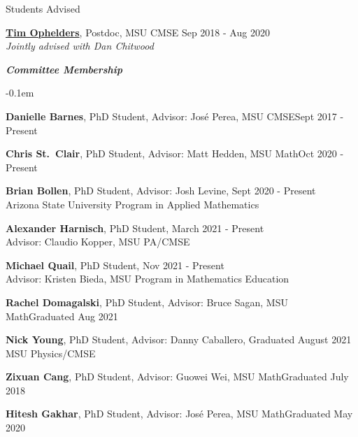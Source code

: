 \documentclass{resume} %
\begin{document}
\begin{rSection}{Students Advised}
\begin{list}{}{\leftmargin=1em}
   \item \textbf{\href{https://research.tue.nl/en/persons/tim-ae-ophelders}{Tim Ophelders}}, Postdoc, MSU CMSE \hfill Sep 2018 - Aug 2020\\
   \phantom{XXX} \textit{Jointly advised with Dan Chitwood}
\end{list}

\textbf{\textit{Committee Membership}}
\begin{list}{}{\leftmargin=1em}
   \itemsep -0.1em %


   \item \textbf{Danielle Barnes}, PhD Student, Advisor: Jos\'e Perea, MSU CMSE\hfill Sept 2017 - Present




   \item \textbf{Chris St.~Clair}, PhD Student, Advisor: Matt Hedden, MSU Math\hfill Oct 2020 - Present
    \item \textbf{Brian Bollen}, PhD Student, Advisor: Josh Levine, \hfill Sept 2020 - Present\\
    \phantom{xxx}Arizona State University Program in Applied Mathematics
   \item \textbf{Alexander Harnisch}, PhD Student, \hfill March 2021 - Present\\
   \phantom{xxx}Advisor: Claudio Kopper, MSU PA/CMSE
   \item \textbf{Michael Quail}, PhD Student, \hfill Nov 2021 - Present\\
   \phantom{xxx}Advisor: Kristen Bieda, MSU Program in Mathematics Education

   \item \textbf{Rachel Domagalski}, PhD Student, Advisor: Bruce Sagan, MSU Math\hfill Graduated Aug 2021
   \item \textbf{Nick Young}, PhD Student, Advisor: Danny Caballero, \hfill Graduated August 2021\\
   \phantom{xxx}MSU Physics/CMSE

   \item \textbf{Zixuan Cang}, PhD Student, Advisor: Guowei Wei, MSU Math\hfill Graduated July 2018

   \item \textbf{Hitesh Gakhar}, PhD Student, Advisor: Jos\'e Perea, MSU Math\hfill Graduated May 2020


\end{list}
\end{rSection}
\end{document}
